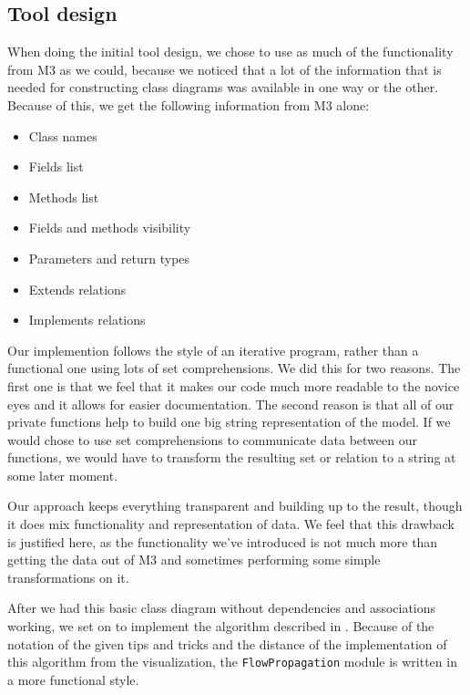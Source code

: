\subsection{Tool design}
	When doing the initial tool design, we chose to use as much of the functionality from M3 as we could, because we noticed that a lot of the information that is needed for constructing class diagrams was available in one way or the other.
	Because of this, we get the following information from M3 alone:

	\begin{itemize}
		\item Class names
		\item Fields list
		\item Methods list
		\item Fields and methods visibility
		\item Parameters and return types
		\item Extends relations
		\item Implements relations
	\end{itemize}

	Our implemention follows the style of an iterative program, rather than a functional one using lots of set comprehensions.
	We did this for two reasons.
	The first one is that we feel that it makes our code much more readable to the novice eyes and it allows for easier documentation.
	The second reason is that all of our private functions help to build one big string representation of the model.
	If we would chose to use set comprehensions to communicate data between our functions, we would have to transform the resulting set or relation to a string at some later moment.

	Our approach keeps everything transparent and building up to the result, though it does mix functionality and representation of data.
	We feel that this drawback is justified here, as the functionality we've introduced is not much more than getting the data out of M3 and sometimes performing some simple transformations on it.
	
	After we had this basic class diagram without dependencies and associations working, we set on to implement the algorithm described in \cite{rev-eng}.
	Because of the notation of the given tips and tricks and the distance of the implementation of this algorithm from the visualization, the \texttt{FlowPropagation} module is written in a more functional style.\\

